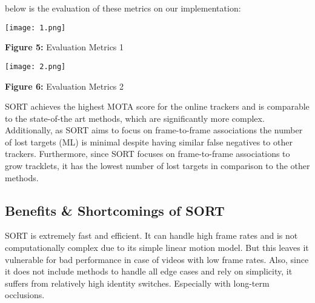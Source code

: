 \documentclass[11pt]{article}
\begin{document}
below is the evaluation of these metrics on our implementation:	
\begin{center}
\texttt{[image: 1.png]}

\textbf{Figure 5:} Evaluation Metrics 1 
\end{center}
\begin{center}
\texttt{[image: 2.png]}

\textbf{Figure 6:} Evaluation Metrics 2 
\end{center}

	SORT achieves the highest MOTA score for the online trackers and is comparable to the state-of-the art methods, which are significantly more complex. Additionally, as SORT aims to focus on frame-to-frame associations the number of lost targets (ML) is minimal despite having similar false negatives to other trackers. Furthermore, since SORT focuses on
frame-to-frame associations to grow tracklets, it has the lowest number of lost targets in comparison to the other methods.
	
	\subsection{Benefits \& Shortcomings of SORT}
SORT is extremely fast and efficient. It can handle high frame rates and is not computationally complex due to its simple linear motion model. But this leaves it vulnerable for bad performance in case of videos with low frame rates. Also, since it does not include methods to handle all edge cases and rely on simplicity, it suffers from relatively high identity switches. Especially with long-term occlusions. 
\end{document}
